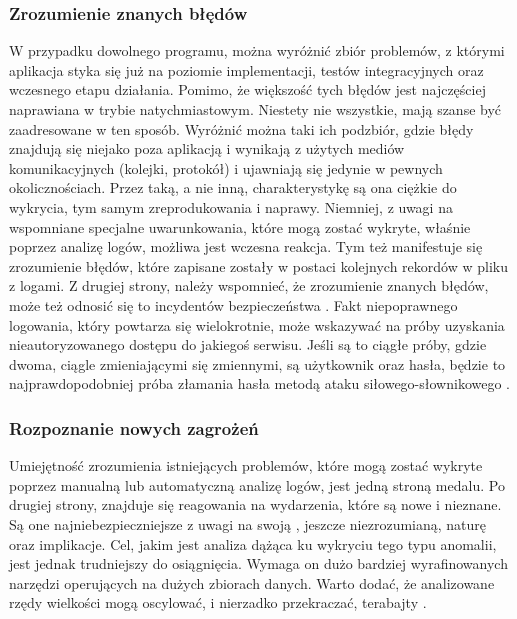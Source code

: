         \subsubsection{Zrozumienie znanych błędów}
        W przypadku dowolnego programu, można wyróżnić zbiór problemów,
        z którymi aplikacja styka się już na poziomie implementacji,
        testów integracyjnych oraz wczesnego etapu działania. Pomimo, że większość tych błędów jest najczęściej
        naprawiana w trybie natychmiastowym. Niestety nie wszystkie, mają szanse być zaadresowane w ten sposób.
        Wyróżnić można taki ich podzbiór, gdzie błędy znajdują się niejako poza aplikacją i wynikają z użytych
        mediów komunikacyjnych (kolejki, protokół) i ujawniają się jedynie w pewnych okolicznościach.
        Przez taką, a nie inną, charakterystykę są ona ciężkie do wykrycia, tym samym zreprodukowania i naprawy.
        Niemniej, z uwagi na wspomniane specjalne uwarunkowania, które mogą zostać wykryte, właśnie poprzez analizę logów,
        możliwa jest wczesna reakcja. Tym też manifestuje się zrozumienie błędów, które zapisane zostały
        w postaci kolejnych rekordów w pliku z logami. 
        Z drugiej strony, należy wspomnieć, że zrozumienie znanych błędów, może też odnosić się to incydentów
        bezpieczeństwa . Fakt niepoprawnego logowania, który powtarza się wielokrotnie, może wskazywać na próby
        uzyskania nieautoryzowanego dostępu do jakiegoś serwisu. Jeśli są to ciągłe próby, gdzie dwoma, ciągle
        zmieniającymi się zmiennymi, są użytkownik oraz hasła, będzie to najprawdopodobniej próba złamania hasła
        metodą ataku siłowego-słownikowego \cite{logging_log_management}. 
        
        \subsubsection{Rozpoznanie nowych zagrożeń}
        Umiejętność zrozumienia istniejących problemów, które mogą zostać wykryte poprzez manualną lub
        automatyczną analizę logów, jest jedną stroną medalu. Po drugiej strony, znajduje się reagowania
        na wydarzenia, które są nowe i nieznane. Są one najniebezpieczniejsze z uwagi na swoją 
        , jeszcze niezrozumianą, naturę oraz implikacje. Cel, jakim jest analiza dążąca ku wykryciu tego
        typu anomalii, jest jednak trudniejszy do osiągnięcia. Wymaga on dużo bardziej wyrafinowanych narzędzi
        operujących na dużych zbiorach danych. Warto dodać, że analizowane rzędy wielkości mogą oscylować, i 
        nierzadko przekraczać, terabajty \cite{logging_log_management}. 
        
